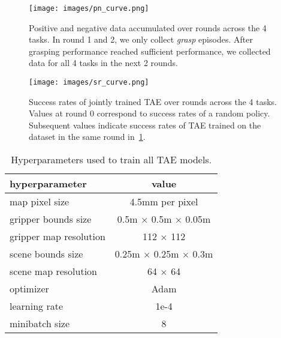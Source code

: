 \documentclass[10pt,twocolumn,letterpaper]{article}
\begin{document}




\begin{figure}
    \texttt{[image: images/pn\_curve.png]}
    \caption{Positive and negative data accumulated over rounds across the 4 tasks. In round 1 and 2, we only collect \emph{grasp} episodes. After grasping performance reached sufficient performance, we collected data for all 4 tasks in the next 2 rounds.}
    \label{fig:data}
  \end{figure}

\begin{figure}
    \texttt{[image: images/sr\_curve.png]}
    \caption{Success rates of jointly trained TAE over rounds across the 4 tasks. Values at round 0 correspond to success rates of a random policy. Subsequent values indicate success rates of TAE trained on the dataset in the same round in~\cref{fig:data}.}
    \label{fig:sr_curve}
\end{figure}


\begin{table}
  \centering
  \begin{tabular}{l c}
    \toprule
    hyperparameter & value \\
    \midrule
    map pixel size &  4.5mm per pixel  \\
    gripper bounds size   & 0.5m $\times$ 0.5m $\times$ 0.05m \\
    gripper map resolution  & 112 $\times$ 112 \\
    scene bounds size &  0.25m $\times$ 0.25m $\times$ 0.3m  \\
    scene map resolution  & 64 $\times$ 64  \\
    \midrule
    optimizer   & Adam \\
    learning rate &  1e-4  \\
    minibatch size &  8  \\
    \bottomrule
  \end{tabular}
  \caption{Hyperparameters used to train all TAE models.}
  \label{tab:hyperparam}
\end{table}
\end{document}
